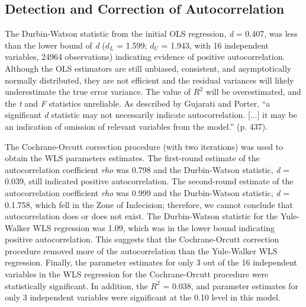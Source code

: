 \documentclass[sigconf]{acmart}
\begin{document}

\subsection{Detection and Correction of Autocorrelation}

The Durbin-Watson statistic from the initial OLS regression, \textit{d} = 0.407, 
was less than the lower bound of \textit{d} ($d_L$ = 1.599; $d_U$ = 1.943, with 
16 independent variables, 24964 observations) indicating evidence of positive 
autocorrelation. Although the OLS estimators are still unbiased, consistent, 
and asymptotically normally distributed, they are not efficient and the residual 
variances will likely underestimate the true error variance. The value of $R^2$ 
will be overestimated, and the \textit{t} and \textit{F} statistics unreliable. 
As described by Gujarati and Porter, ``a significant \textit{d} statistic may not 
necessarily indicate autocorrelation. [...] it may be an indication of omission 
of relevant variables from the model.'' (p. 437)\cite{gujarati09}.  

The Cochrane-Orcutt correction procedure (with two iterations) was used to 
obtain the WLS parameters estimates. The first-round estimate of the 
autocorrelation coefficient \textit{rho} was 0.798 and the Durbin-Watson 
statistic, \textit{d} = 0.039, still indicated positive autocorrelation. The 
second-round estimate of the autocorrelation coefficient \textit{rho} was 0.999 
and the Durbin-Watson statistic, \textit{d} = 0.1.758, which fell in the Zone 
of Indecision; therefore, we cannot conclude that autocorrelation does or does 
not exist. The Durbin-Watson statistic for the Yule-Walker WLS regression was 1.09, 
which was in the lower bound indicating positive autocorrelation. This suggests 
that the Cochrane-Orcutt correction procedure removed more of the autocorrelation 
than the Yule-Walker WLS regression. Finally, the parameter estimates for only 
3 out of the 16 independent variables in the WLS regression for the Cochrane-Orcutt 
procedure were statistically significant. In addition, the $R^2$ = 0.038, and 
parameter estimates for only 3 independent variables were significant at the 
0.10 level in this model. 
\end{document}

